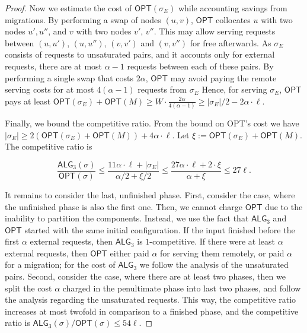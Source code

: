 \documentclass[a4paper,anonymous,USenglish]{lipics-v2019}
\newcommand{\OPT}{\textsf{OPT}\xspace}
\newcommand{\TAlg}{{\ensuremath{\textsf{ALG}_{3}}}\xspace}
\begin{document}
\begin{proof}
	
	Now we estimate the cost of $\OPT(\sigma_E)$ while accounting savings from migrations.
	By performing a swap of nodes $(u,v)$, $\OPT$ collocates $u$ with two nodes $u', u''$, and $v$ with two nodes $v'$, $v''$.
	This may allow serving requests between $(u,u')$, $(u,u'')$, $(v,v')$ and $(v,v'')$ for free afterwards.
	As $\sigma_E$ consists of requests to unsaturated pairs, and it accounts only for external requests, there are at most $\alpha-1$ requests between each of these pairs.
	By performing a single swap that costs $2\alpha$, $\OPT$ may avoid paying the remote serving costs for at most $4 (\alpha - 1)$ requests from $\sigma_E$
	Hence, for serving $\sigma_E$, $\OPT$ pays at least $\OPT(\sigma_E) + \OPT(M) \geq W \cdot \frac{2\alpha}{4 (\alpha-1)}\geq |\sigma_E| / 2 - 2 \alpha \cdot \ell$.

	
	Finally, we bound the competitive ratio.
	From the bound on \OPT's cost we have $|\sigma_E| \geq 2(\OPT(\sigma_E)+\OPT(M)) + 4\alpha \cdot \ell$.
	Let $\xi := \OPT(\sigma_E) + \OPT(M)$.
	The competitive ratio is

	\[
		\frac{\TAlg(\sigma)}{\OPT(\sigma)} \leq \frac{11\alpha \cdot \ell + |\sigma_E|}{\alpha/2 + \xi/2} \leq \frac{27\alpha\cdot\ell + 2\cdot \xi}{\alpha + \xi} \leq 27 \ell.
	\]
	
	\medskip
	
	It remains to consider the last, unfinished phase.
	First, consider the case, where the unfinished phase is also the first one.
	Then, we cannot charge $\OPT$ due to the inability to partition the components.
	Instead, we use the fact that \TAlg and $\OPT$ started with the same initial configuration.
	If the input finished before the first $\alpha$ external requests, then \TAlg is $1$-competitive.
	If there were at least $\alpha$ external requests, then $\OPT$ either paid $\alpha$ for serving them remotely, or paid $\alpha$ for a migration; for the cost of \TAlg we follow the analysis of the unsaturated pairs.
	Second, consider the case, where there are at least two phases, then we split the cost $\alpha$ charged in the penultimate phase into last two phases, and follow the analysis regarding the unsaturated requests.
	This way, the competitive ratio increases at most twofold in comparison to a finished phase, and the competitive ratio is $\TAlg(\sigma)/\OPT(\sigma) \leq 54\ell$.
\end{proof}
\end{document}
